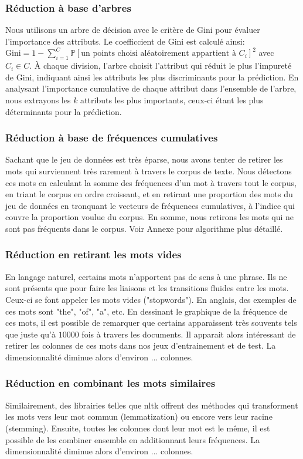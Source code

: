 \documentclass{article}
\begin{document}
\subsubsection{Réduction à base d'arbres}
Nous utilisons un arbre de décision avec le critère de Gini pour évaluer l'importance des attributs. Le coefficcient de Gini est calculé ainsi: $\text{Gini} = 1 - \sum_{i=1}^{C} \mathbb{P}[\text{un points choisi aléatoirement appartient à $C_i$}]^2$ avec $C_i \in C$. À chaque division, l’arbre choisit l’attribut qui réduit le plus l'impureté de Gini, indiquant ainsi les attributs les plus discriminants pour la prédiction. En analysant l'importance cumulative de chaque attribut dans l'ensemble de l'arbre, nous extrayons les $k$ attributs les plus importants, ceux-ci étant les plus déterminants pour la prédiction.
\subsubsection{Réduction à base de fréquences cumulatives}
Sachant que le jeu de données est très éparse,  nous avons tenter de retirer les mots qui surviennent très rarement à travers le corpus de texte. Nous détectons ces mots en calculant la somme des fréquences d'un mot à travers tout le corpus, en triant le corpus en ordre croissant, et en retirant une proportion des mots du jeu de données en tronquant le vecteurs de fréquences cumulatives, à l'indice qui couvre la proportion voulue du corpus. En somme, nous retirons les mots qui ne sont pas fréquents dans le corpus. Voir Annexe pour algorithme plus détaillé. 
\subsubsection{Réduction en retirant les mots vides}
En langage naturel, certains mots n'apportent pas de sens à une phrase. Ils ne sont présents que pour faire les liaisons et les transitions fluides entre les mots. Ceux-ci se font appeler les mots vides ("stopwords"). En anglais, des exemples de ces mots sont "the", "of", "a", etc. En dessinant le graphique de la fréquence de ces mots, il est possible de remarquer que certains apparaissent très souvents tels que juste qu'à $10 000$ fois à travers les documents. Il apparait alors intéressant de retirer les colonnes de ces mots dans nos jeux d'entrainement et de test. La dimensionnalité diminue alors d'environ ... colonnes.
\subsubsection{Réduction en combinant les mots similaires}
Similairement, des librairies telles que nltk offrent des méthodes qui transforment les mots vers leur mot commun (lemmatization) ou encore vers leur racine (stemming). Ensuite, toutes les colonnes dont leur mot est le même, il est possible de les combiner ensemble en additionnant leurs fréquences. La dimensionnalité diminue alors d'environ ... colonnes.
\end{document}
